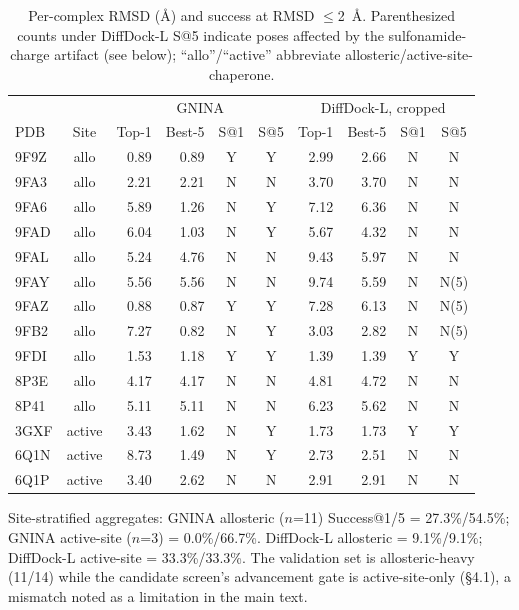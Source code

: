 \documentclass{article}
\begin{document}
\begin{table}[h]
\centering
\footnotesize
\begin{tabular}{lc rrcc rrcc}
\toprule
 & & \multicolumn{4}{c}{GNINA} & \multicolumn{4}{c}{DiffDock-L, cropped} \\
PDB & Site & Top-1 & Best-5 & S@1 & S@5 & Top-1 & Best-5 & S@1 & S@5 \\
\midrule
9F9Z & allo & 0.89 & 0.89 & Y & Y & 2.99 & 2.66 & N & N \\
9FA3 & allo & 2.21 & 2.21 & N & N & 3.70 & 3.70 & N & N \\
9FA6 & allo & 5.89 & 1.26 & N & Y & 7.12 & 6.36 & N & N \\
9FAD & allo & 6.04 & 1.03 & N & Y & 5.67 & 4.32 & N & N \\
9FAL & allo & 5.24 & 4.76 & N & N & 9.43 & 5.97 & N & N \\
9FAY & allo & 5.56 & 5.56 & N & N & 9.74 & 5.59 & N & N(5) \\
9FAZ & allo & 0.88 & 0.87 & Y & Y & 7.28 & 6.13 & N & N(5) \\
9FB2 & allo & 7.27 & 0.82 & N & Y & 3.03 & 2.82 & N & N(5) \\
9FDI & allo & 1.53 & 1.18 & Y & Y & 1.39 & 1.39 & Y & Y \\
8P3E & allo & 4.17 & 4.17 & N & N & 4.81 & 4.72 & N & N \\
8P41 & allo & 5.11 & 5.11 & N & N & 6.23 & 5.62 & N & N \\
3GXF & active & 3.43 & 1.62 & N & Y & 1.73 & 1.73 & Y & Y \\
6Q1N & active & 8.73 & 1.49 & N & Y & 2.73 & 2.51 & N & N \\
6Q1P & active & 3.40 & 2.62 & N & N & 2.91 & 2.91 & N & N \\
\bottomrule
\end{tabular}
\caption{Per-complex RMSD (\AA) and success at RMSD $\leq$2~\AA. Parenthesized counts under DiffDock-L S@5 indicate poses affected by the sulfonamide-charge artifact (see below); ``allo''/``active'' abbreviate allosteric/active-site-chaperone.}
\end{table}

Site-stratified aggregates: GNINA allosteric ($n$=11) Success@1/5 = 27.3\%/54.5\%; GNINA active-site ($n$=3) = 0.0\%/66.7\%. DiffDock-L allosteric = 9.1\%/9.1\%; DiffDock-L active-site = 33.3\%/33.3\%. The validation set is allosteric-heavy (11/14) while the candidate screen's advancement gate is active-site-only (\S4.1), a mismatch noted as a limitation in the main text.
\end{document}
